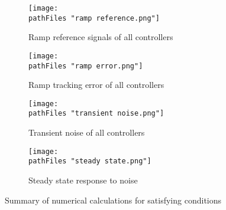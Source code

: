 \documentclass[
	12pt, %
]{fphw}
\newcommand\pathFiles{"summary/"}
\begin{document}
\begin{figure}[!htb]
  \centering
  \begin{minipage}[b]{0.45\textwidth}
      \texttt{[image: \\pathFiles "ramp reference.png"]}
    \caption{Ramp reference signals of all controllers}
    \label{ramp}
  \end{minipage}
  \hfill
  \begin{minipage}[b]{0.45\textwidth}
      \texttt{[image: \\pathFiles "ramp error.png"]}
    \caption{Ramp tracking error of all controllers}
    \label{ramp err}
    \end{minipage}
\end{figure}

\begin{figure}[!htb]
  \centering
  \begin{minipage}[b]{0.45\textwidth}
    \texttt{[image: \\pathFiles "transient noise.png"]}
    \caption{Transient noise of all controllers}
    \label{transient}
  \end{minipage}
  \hfill
  \begin{minipage}[b]{0.45\textwidth}
    \texttt{[image: \\pathFiles "steady state.png"]}
    \caption{Steady state response to noise}
    \label{steady state}
    \end{minipage}
\end{figure}


\begin{table}[!htb]
\parbox{.45\linewidth}{
\centering
    \caption{Summary of numerical calculations for satisfying conditions}
    \label{conditions}
}
\hfill
\parbox{.45\linewidth}{
\centering
    \caption{Numerical values for the Bode plot}
    \label{Bode}
}
\end{table}
\end{document}
